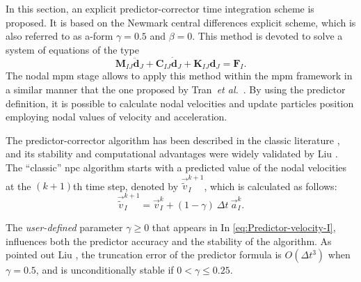 \documentclass[preprint,12pt,a4paper]{elsarticle}
\newcommand{\Matrix}[1]{
  \ensuremath{\mathbf{{#1}}}
}
\newcommand{\Vector}[1]{
  \ensuremath{\mathbf{{#1}}}
}
\begin{document}
In this section, an explicit predictor-corrector time integration
scheme is proposed. It is based on the Newmark central differences
explicit scheme, which is also referred to as a-form 
$\gamma = 0.5$ and $\beta = 0$. This method is devoted to solve a system of equations of the type
\begin{equation*}
  \Matrix{M}_{IJ}\ddot{\Vector{d}}_{J} + \Matrix{C}_{IJ}\dot{\Vector{d}}_{J} +
  \Matrix{K}_{IJ}\Vector{d}_{J} = \Vector{F}_{I}.
\end{equation*}
The nodal \acrshort{mpm} stage allows to apply this method
within the \acrshort{mpm} framework in a similar manner that the one
proposed by Tran~\textit{et al.}~\cite{Tran2019e}. By using the predictor definition, it is possible to calculate nodal velocities and update particles position employing nodal values
of velocity and acceleration. 

The predictor-corrector algorithm has
been described in the classic literature \cite{Hughes2000}, and its
stability and computational advantages were widely validated by Liu
\cite{Xiaojian94}. The ``classic'' \acrfull{npc} algorithm starts with a
predicted value of the nodal velocities at the $(k+1)$th time step, denoted by $\vec{\tilde{v}}_I^{k+1}$, which is calculated as follows:
\begin{equation}
  \label{eq:Predictor-velocity-I}
  \vec{\tilde{v}}_I^{k+1} = \vec{v}_I^k + (1 - \gamma)\ \Delta t\ \vec{a}_I^k.
\end{equation}

The \textit{user-defined}
parameter $\gamma \geq 0$ that appears in In \eqref{eq:Predictor-velocity-I}, influences both the predictor accuracy
and the stability of the algorithm. As pointed out Liu
\cite{Xiaojian94}, the truncation error of the predictor formula is
$O(\Delta t^3)$ when $\gamma = 0.5$, and is unconditionally stable if
$ 0 < \gamma \leq 0.25$.
\end{document}
